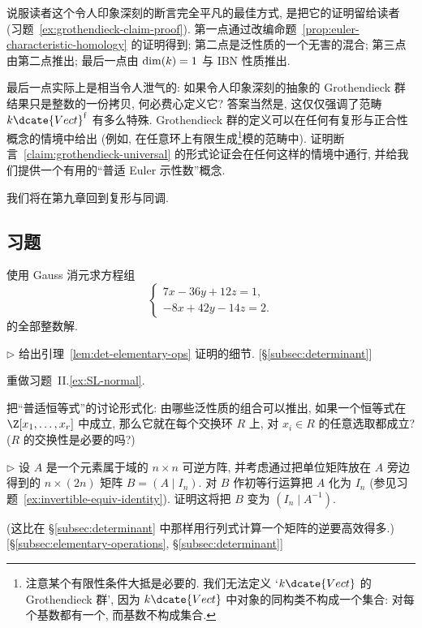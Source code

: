 说服读者这个令人印象深刻的断言完全平凡的最佳方式, 是把它的证明留给读者 (习题~\ref{ex:grothendieck-claim-proof}). 第一点通过改编命题~\ref{prop:euler-characteristic-homology} 的证明得到; 第二点是泛性质的一个无害的混合; 第三点由第二点推出; 最后一点由 $\operatorname{dim}(k)=1$ 与 IBN 性质推出.

最后一点实际上是相当令人泄气的: 如果令人印象深刻的抽象的 Grothendieck 群结果只是整数的一份拷贝, 何必费心定义它? 答案当然是, 这仅仅强调了范畴 $k\dcate{Vect}^{\mathrm f}$ 有多么特殊. Grothendieck 群的定义可以在任何有复形与正合性概念的情境中给出 (例如, 在任意环上有限生成\footnote{注意某个有限性条件大抵是必要的. 我们无法定义 `$k\dcate{Vect}$ 的 Grothendieck 群', 因为 $k\dcate{Vect}$ 中对象的同构类不构成一个集合: 对每个基数都有一个, 而基数不构成集合.}模的范畴中). 证明断言~\ref{claim:grothendieck-universal} 的形式论证会在任何这样的情境中通行, 并给我们提供一个有用的``普适 Euler 示性数''概念.

我们将在第九章回到复形与同调.

\subsection*{习题}
{}

\begin{prob}
\label{ex:gaussian-integer-system}
使用 Gauss 消元求方程组
\[
\left\{\begin{array}{c}
7x-36y+12z=1,\\
-8x+42y-14z=2.
\end{array}\right.
\]
的全部整数解.
\end{prob}

\begin{prob}
\label{ex:det-lemma-details}
$\triangleright$ 给出引理~\ref{lem:det-elementary-ops} 证明的细节. [§\ref{subsec:determinant}]
\end{prob}

\begin{prob}
\label{ex:redo-ex-II-8-8}
重做习题~II.\ref{ex:SL-normal}.
\end{prob}

\begin{prob}
\label{ex:universal-identities}
把``普适恒等式''的讨论形式化: 由哪些泛性质的组合可以推出, 如果一个恒等式在 $\Z[x_1,\ldots,x_r]$ 中成立, 那么它就在每个交换环 $R$ 上, 对 $x_i\in R$ 的任意选取都成立? ($R$ 的交换性是必要的吗?)
\end{prob}

\begin{prob}
\label{ex:inverse-by-row-ops}
$\triangleright$ 设 $A$ 是一个元素属于域的 $n\times n$ 可逆方阵, 并考虑通过把单位矩阵放在 $A$ 旁边得到的 $n\times(2n)$ 矩阵 $B=(A\mid I_n)$. 对 $B$ 作初等行运算把 $A$ 化为 $I_n$ (参见习题~\ref{ex:invertible-equiv-identity}). 证明这将把 $B$ 变为 $(I_n\mid A^{-1})$.

(这比在 §\ref{subsec:determinant} 中那样用行列式计算一个矩阵的逆要高效得多.) [§\ref{subsec:elementary-operations}, §\ref{subsec:determinant}]
\end{prob}


